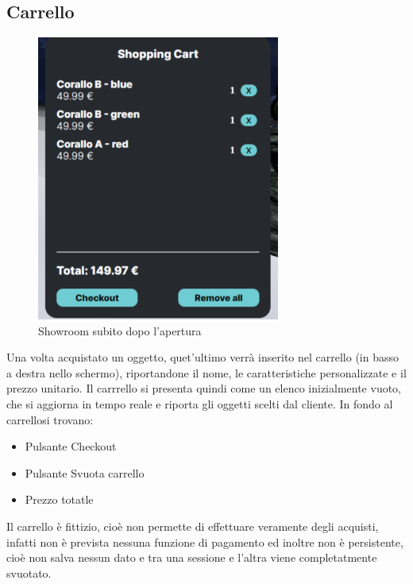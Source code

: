 \subsection{Carrello}
\begin{figure}[H]
  \renewcommand{\thefigure}{2}
\begin{center}
  \includegraphics[width=8cm]{./res/images/carrello.png}
\end{center}
  \caption{Showroom subito dopo l'apertura}
  \label{Showroom subito dopo l'apertura}
\end{figure}

Una volta acquistato un oggetto, quet'ultimo verrà inserito nel carrello (in basso a destra nello schermo), riportandone il nome, le caratteristiche personalizzate e il prezzo unitario.
Il carrrello si presenta quindi come un elenco inizialmente vuoto, che si aggiorna in tempo reale e riporta gli oggetti scelti dal cliente.
In fondo al carrellosi trovano:
\begin{itemize}
	\item Pulsante Checkout
	\item Pulsante Svuota carrello
	\item Prezzo totatle
\end{itemize}
Il carrello è fittizio, cioè non permette di effettuare veramente degli acquisti, infatti non è prevista nessuna funzione di pagamento ed inoltre non è persistente, cioè non salva nessun dato e tra una sessione e l'altra viene completatmente svuotato.

\pagebreak
